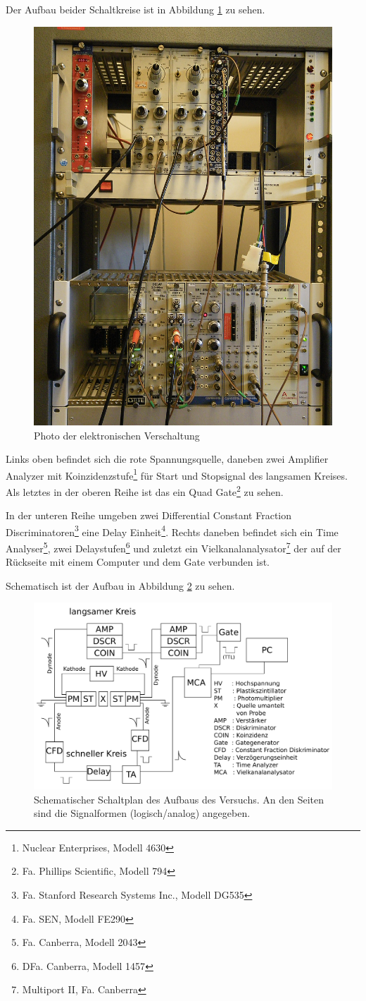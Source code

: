 \documentclass[a4paper,12pt]{article}
\begin{document}
Der Aufbau beider Schaltkreise ist in Abbildung \ref{fig:aufbau} zu sehen.
\begin{figure}[htb]
		\centering
		\includegraphics[width=.5\textwidth]{aufbau.jpg}
		\caption{Photo der elektronischen Verschaltung}
		\label{fig:aufbau}
\end{figure}

Links oben befindet sich die rote Spannungsquelle, daneben zwei Amplifier Analyzer mit Koinzidenzstufe\footnote{Nuclear Enterprises, Modell 4630} für Start und Stopsignal des langsamen Kreises.
Als letztes in der oberen Reihe ist das ein Quad Gate\footnote{Fa. Phillips Scientific, Modell 794} zu sehen.

In der unteren Reihe umgeben zwei Differential Constant Fraction Discriminatoren\footnote{Fa. Stanford Research Systems Inc., Modell DG535} eine Delay Einheit\footnote{Fa. SEN, Modell FE290}.
Rechts daneben befindet sich ein Time Analyser\footnote{Fa. Canberra, Modell 2043}, zwei Delaystufen\footnote{DFa. Canberra, Modell 1457} und zuletzt ein Vielkanalanalysator\footnote{Multiport II, Fa. Canberra} der auf der Rückseite mit einem Computer und dem Gate verbunden ist.

Schematisch ist der Aufbau in Abbildung \ref{fig:schaltplan} zu sehen.
\begin{figure}[htb]
		\centering
		\includegraphics[width=1.0\textwidth]{Schaltplan_custom.pdf}
		\caption{Schematischer Schaltplan des Aufbaus des Versuchs.
		An den Seiten sind die Signalformen (logisch/analog) angegeben.}
		\label{fig:schaltplan}
\end{figure}
\end{document}
